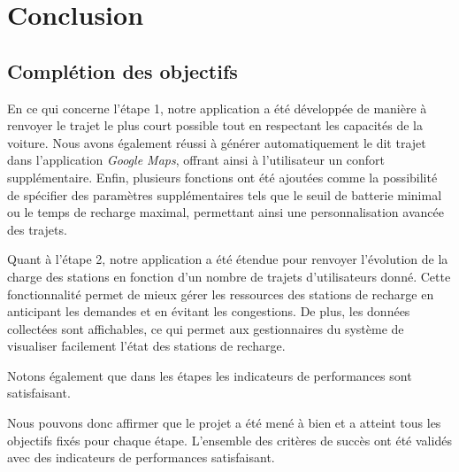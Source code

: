 \documentclass[a4paper, 12pt]{report}
\begin{document}
\chapter{Conclusion}
\minitoc
{}
\clearpage
\section{Complétion des objectifs}

En ce qui concerne l'étape 1, notre application a été développée de manière à renvoyer le trajet le plus court possible tout en respectant les capacités de la voiture. Nous avons également réussi à générer automatiquement le dit trajet dans l'application \textit{Google Maps}, offrant ainsi à l'utilisateur un confort supplémentaire. Enfin, plusieurs fonctions ont été ajoutées comme la possibilité de spécifier des paramètres supplémentaires tels que le seuil de batterie minimal ou le temps de recharge maximal, permettant ainsi une personnalisation avancée des trajets. 
\bigskip

Quant à l'étape 2, notre application a été étendue pour renvoyer l'évolution de la charge des stations en fonction d'un nombre de trajets d'utilisateurs donné. Cette fonctionnalité permet de mieux gérer les ressources des stations de recharge en anticipant les demandes et en évitant les congestions. De plus, les données collectées sont affichables, ce qui permet aux gestionnaires du système de visualiser facilement l'état des stations de recharge.
\bigskip

Notons également que dans les étapes les indicateurs de performances sont satisfaisant.
\bigskip

Nous pouvons donc affirmer que le projet a été mené à bien et a atteint tous les objectifs fixés pour chaque étape. L'ensemble des critères de succès ont été validés avec des indicateurs de performances satisfaisant.
\clearpage
\end{document}
